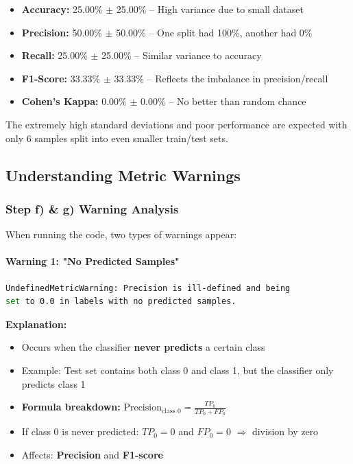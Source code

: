\documentclass[12pt,a4paper]{article}
\begin{document}
\begin{itemize}
    \item \textbf{Accuracy:} 25.00\% $\pm$ 25.00\% -- High variance due to small dataset
    \item \textbf{Precision:} 50.00\% $\pm$ 50.00\% -- One split had 100\%, another had 0\%
    \item \textbf{Recall:} 25.00\% $\pm$ 25.00\% -- Similar variance to accuracy
    \item \textbf{F1-Score:} 33.33\% $\pm$ 33.33\% -- Reflects the imbalance in precision/recall
    \item \textbf{Cohen's Kappa:} 0.00\% $\pm$ 0.00\% -- No better than random chance
\end{itemize}

The extremely high standard deviations and poor performance are expected with only 6 samples split into even smaller train/test sets.

\subsection{Understanding Metric Warnings}

\subsubsection{Step f) \& g) Warning Analysis}

When running the code, two types of warnings appear:

\paragraph{Warning 1: "No Predicted Samples"}

\begin{lstlisting}[language=bash, frame=single]
UndefinedMetricWarning: Precision is ill-defined and being 
set to 0.0 in labels with no predicted samples.
\end{lstlisting}

\textbf{Explanation:}
\begin{itemize}
    \item Occurs when the classifier \textbf{never predicts} a certain class
    \item Example: Test set contains both class 0 and class 1, but the classifier only predicts class 1
    \item \textbf{Formula breakdown:} $\text{Precision}_{\text{class 0}} = \frac{TP_0}{TP_0 + FP_0}$
    \item If class 0 is never predicted: $TP_0 = 0$ and $FP_0 = 0$ $\Rightarrow$ division by zero
    \item Affects: \textbf{Precision} and \textbf{F1-score}
\end{itemize}
\end{document}
